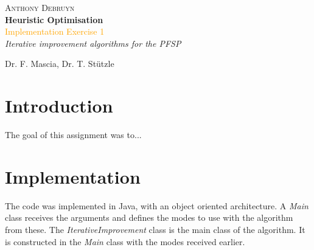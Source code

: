 \newcommand*{\titleTH}{\begingroup %
\raggedleft %
\vspace*{\baselineskip} %

{\Large \textsc{Anthony Debruyn}}\\[0.167\textheight] %

{\LARGE\bfseries Heuristic Optimisation}\\[\baselineskip] %

{\textcolor{Orange}{\Huge Implementation Exercise 1}}\\[\baselineskip] %

{\Large \textit{Iterative improvement algorithms for the PFSP}}\par %

\vfill %


{\large Dr. F. Mascia, Dr. T. Stützle \course}\par %

\endgroup}


 

\thispagestyle{empty}

\titleTH %

\newpage

\section{Introduction}
The goal of this assignment was to...

\section{Implementation}
The code was implemented in Java, with an object oriented architecture. A \emph{Main} class receives the arguments and defines the modes to use with the algorithm from these. The \emph{IterativeImprovement} class is the main class of the algorithm. It is constructed in the \emph{Main} class with the modes received earlier.\\

